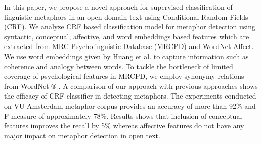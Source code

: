 In this paper, we propose a novel approach for supervised classification of linguistic metaphors in an open domain text using Conditional Random Fields (CRF). We analyze CRF based classification model for metaphor detection using syntactic, conceptual, affective, and word embeddings based features which are extracted from MRC Psycholinguistic Database (MRCPD) and WordNet-Affect. We use word embeddings given by Huang et al. to capture information such as coherence and analogy between words. To tackle the bottleneck of limited coverage of psychological features in MRCPD, we employ synonymy relations from WordNet ® . A comparison of our approach with previous approaches shows the efficacy of CRF classifier in detecting metaphors. The experiments conducted on VU Amsterdam metaphor corpus provides an accuracy of more than 92\% and F-measure of approximately 78\%. Results shows that inclusion of conceptual features improves the recall by 5\% whereas affective features do not have any major impact on metaphor detection in open text.

